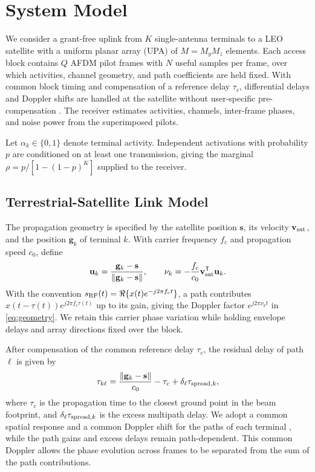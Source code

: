 \section{System Model}
\label{sec:system}

We consider a grant-free uplink from $K$ single-antenna terminals to a
LEO satellite with a uniform planar array (UPA) of $M=M_yM_z$ elements.
Each access block contains $Q$ AFDM pilot frames with $N$ useful samples
per frame, over which activities, channel geometry, and path coefficients
are held fixed. With common block timing and compensation of a reference
delay $\tau_c$, differential delays and Doppler shifts are handled at
the satellite without user-specific pre-compensation \cite{shen2025}.
The receiver estimates activities, channels, inter-frame phases, and
noise power from the superimposed pilots.

Let $\alpha_k\in\{0,1\}$ denote terminal activity. Independent
activations with probability $p$ are conditioned on at least one
transmission, giving the marginal $\rho=p/[1-(1-p)^K]$ supplied to
the receiver.

\subsection{Terrestrial-Satellite Link Model}

The propagation geometry is specified by the satellite position
$\mathbf{s}$, its velocity $\mathbf{v}_{\rm sat}$, and the position
$\mathbf{g}_k$ of terminal $k$.
With carrier frequency $f_c$ and propagation speed $c_0$, define
\begin{equation}
 \mathbf{u}_k=\frac{\mathbf{g}_k-\mathbf{s}}
 {\left\lVert\mathbf{g}_k-\mathbf{s}\right\rVert},
 \qquad
 \nu_k=-\frac{f_c}{c_0}\mathbf{v}_{\rm sat}^{\mathsf T}\mathbf{u}_k.
 \label{eq:geometry}
\end{equation}
With the convention $s_{\rm RF}(t)=\Re\{x(t)e^{-j2\pi f_ct}\}$,
a path contributes $x(t-\tau(t))e^{j2\pi f_c\tau(t)}$ up to its gain,
giving the Doppler factor $e^{j2\pi\nu_kt}$ in \eqref{eq:geometry}.
We retain this carrier phase variation while holding envelope delays
and array directions fixed over the block.

After compensation of the common reference delay $\tau_c$, the residual
delay of path $\ell$ is given by
\begin{equation}
 \tau_{k\ell}=\frac{\left\lVert\mathbf{g}_k-\mathbf{s}\right\rVert}{c_0}-\tau_c
             +\delta_\ell\tau_{{\rm spread},k},
 \label{eq:path-delay}
\end{equation}
where $\tau_c$ is the propagation time to the closest ground point in the
beam footprint, and $\delta_\ell\tau_{{\rm spread},k}$ is the excess
multipath delay. We adopt a common spatial response and a common Doppler
shift for the paths of each terminal
\cite{li2023,huang2026}, while the path gains and excess delays remain
path-dependent. This common Doppler allows the phase evolution across
frames to be separated from the sum of the path contributions.

